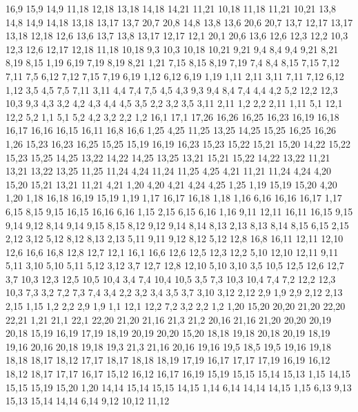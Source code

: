 16,9
15,9
14,9
%
11,18
12,18
13,18
14,18
14,21
11,21
%
10,18
11,18
11,21
10,21
%
13,8
14,8
14,9
14,18
13,18
13,17
%
13,7
20,7
20,8
14,8
13,8
%
13,6
20,6
20,7
13,7
%
12,17
13,17
13,18
12,18
%
12,6
13,6
13,7
13,8
13,17
12,17
%
12,1
20,1
20,6
13,6
12,6
12,3
12,2
%
10,3
12,3
12,6
12,17
12,18
11,18
10,18
%
9,3
10,3
10,18
10,21
9,21
9,4
%
8,4
9,4
9,21
8,21
8,19
8,15
%
1,19
6,19
7,19
8,19
8,21
1,21
%
7,15
8,15
8,19
7,19
%
7,4
8,4
8,15
7,15
7,12
7,11
7,5
%
6,12
7,12
7,15
7,19
6,19
%
1,12
6,12
6,19
1,19
%
1,11
2,11
3,11
7,11
7,12
6,12
1,12
%
3,5
4,5
7,5
7,11
3,11
%
4,4
7,4
7,5
4,5
%
4,3
9,3
9,4
8,4
7,4
4,4
%
4,2
5,2
12,2
12,3
10,3
9,3
4,3
%
3,2
4,2
4,3
4,4
4,5
3,5
%
2,2
3,2
3,5
3,11
2,11
%
1,2
2,2
2,11
1,11
%
5,1
12,1
12,2
5,2
%
1,1
5,1
5,2
4,2
3,2
2,2
1,2
16,1
17,1
17,26
16,26
16,25
16,23
16,19
16,18
16,17
16,16
16,15
16,11
16,8
16,6
%
1,25
4,25
11,25
13,25
14,25
15,25
16,25
16,26
1,26
%
15,23
16,23
16,25
15,25
%
15,19
16,19
16,23
15,23
15,22
15,21
15,20
%
14,22
15,22
15,23
15,25
14,25
%
13,22
14,22
14,25
13,25
%
13,21
15,21
15,22
14,22
13,22
%
11,21
13,21
13,22
13,25
11,25
11,24
%
4,24
11,24
11,25
4,25
%
4,21
11,21
11,24
4,24
%
4,20
15,20
15,21
13,21
11,21
4,21
%
1,20
4,20
4,21
4,24
4,25
1,25
%
1,19
15,19
15,20
4,20
1,20
%
1,18
16,18
16,19
15,19
1,19
%
1,17
16,17
16,18
1,18
%
1,16
6,16
16,16
16,17
1,17
%
6,15
8,15
9,15
16,15
16,16
6,16
%
1,15
2,15
6,15
6,16
1,16
%
9,11
12,11
16,11
16,15
9,15
9,14
9,12
%
8,14
9,14
9,15
8,15
%
8,12
9,12
9,14
8,14
8,13
%
2,13
8,13
8,14
8,15
6,15
2,15
%
2,12
3,12
5,12
8,12
8,13
2,13
%
5,11
9,11
9,12
8,12
5,12
%
12,8
16,8
16,11
12,11
12,10
%
12,6
16,6
16,8
12,8
12,7
%
12,1
16,1
16,6
12,6
12,5
12,3
12,2
%
5,10
12,10
12,11
9,11
5,11
%
3,10
5,10
5,11
5,12
3,12
%
3,7
12,7
12,8
12,10
5,10
3,10
%
3,5
10,5
12,5
12,6
12,7
3,7
%
10,3
12,3
12,5
10,5
10,4
%
3,4
7,4
10,4
10,5
3,5
%
7,3
10,3
10,4
7,4
%
7,2
12,2
12,3
10,3
7,3
%
3,2
7,2
7,3
7,4
3,4
%
2,2
3,2
3,4
3,5
3,7
3,10
3,12
2,12
2,9
%
1,9
2,9
2,12
2,13
2,15
1,15
%
1,2
2,2
2,9
1,9
%
1,1
12,1
12,2
7,2
3,2
2,2
1,2
1,20
15,20
20,20
21,20
22,20
22,21
1,21
%
21,1
22,1
22,20
21,20
21,16
21,3
21,2
%
20,16
21,16
21,20
20,20
20,19
20,18
%
15,19
16,19
17,19
18,19
20,19
20,20
15,20
%
18,18
19,18
20,18
20,19
18,19
%
19,16
20,16
20,18
19,18
%
19,3
21,3
21,16
20,16
19,16
19,5
%
18,5
19,5
19,16
19,18
18,18
18,17
18,12
%
17,17
18,17
18,18
18,19
17,19
%
16,17
17,17
17,19
16,19
%
16,12
18,12
18,17
17,17
16,17
%
15,12
16,12
16,17
16,19
15,19
15,15
15,14
15,13
%
1,15
14,15
15,15
15,19
15,20
1,20
%
14,14
15,14
15,15
14,15
%
1,14
6,14
14,14
14,15
1,15
%
6,13
9,13
15,13
15,14
14,14
6,14
%
9,12
10,12
11,12
